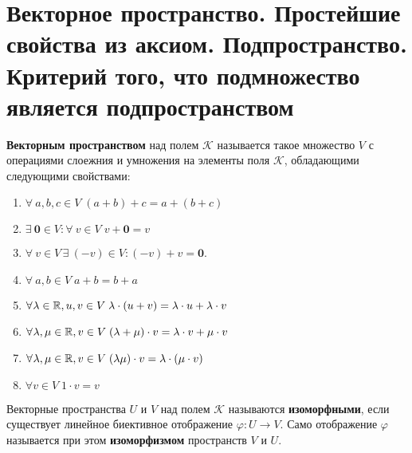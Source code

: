 \section{Векторное пространство. Простейшие свойства из аксиом. Подпространство. Критерий того, что подмножество является подпространством}

\begin{definition}
    \textbf{Векторным пространством} над полем $\mathcal{K}$ называется такое множество $V$ с операциями слоежния и умножения на элементы поля $\mathcal{K}$, обладающими следующими свойствами:
    \begin{enumerate}
            \item $\forall\!\:a, b, c \in V\;(a + b) + c = a + (b + c)$
            \item $\exists\!\:\boldsymbol{0} \in V : \forall\!\:v \in V\;v + \boldsymbol{0} = v$
            \item $\forall\!\:v \in V\,\exists\!\:(-v) \in V: (-v) + v = \boldsymbol{0}$.\quad{}
            \item $\forall\!\: a, b \in V\;a + b = b + a$
            \item $\forall\!\: \lambda \in \mathbb{R}, u, v \in V\; \lambda \cdot (u + v) = \lambda \cdot u + \lambda \cdot v$
            \item $\forall\!\: \lambda, \mu \in \mathbb{R}, v \in V\; (\lambda + \mu) \cdot v = \lambda \cdot v + \mu \cdot v$
            \item $\forall\!\: \lambda, \mu \in \mathbb{R}, v \in V\; (\lambda\mu) \cdot v = \lambda \cdot (\mu \cdot v)$
            \item $\forall v \in V\;1 \cdot v = v$
    \end{enumerate}
\end{definition}

\begin{definition}
    Векторные пространства $U$ и $V$ над полем $\mathcal{K}$ называются \textbf{изоморфными}, если существует линейное биективное отображение $\varphi: U \rightarrow V$. Само отображение $\varphi$ называется при этом \textbf{изоморфизмом} пространств $V$ и $U$.
\end{definition}

